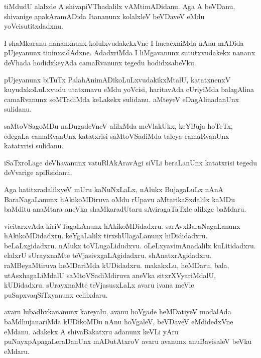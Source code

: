 \documentclass{article}
\begin{document}
\begin{mn}
tiMdudU  alalxde  A  shivapiVThadalilx  vAMtimADidanu.  Aga  A  beVDanu,  shivanige  apakAramADida  
Itananunx  kolalxleV  beVDaveV  eMdu  yoVcisutitxdadxnu.
\end{mn}

\begin{mn}
I  shaMkaranu  nananxnunx  kolulxvudakekxVne  I  hucacxniMda  nAnu  mADida  pUjeyanunx  tininxsidAdxne.  
AdadxriMda  I  liMgavanunx  sututxvudakekx  nananx  deVhada  hodidxkeyAda  camaRvanunx  tegedu  hodidxsabeVku.  
\end{mn}

\begin{mn}
pUjeyanunx  biTuTx  PalahAnimADikoLuLxvudakikxMtalU,  katatxnenxV  kuyudxkoLuLxvudu  utatxmavu  eMdu  yoVcisi,  
haritavAda  cUriyiMda  balagAlina  camaRvanunx  soMTadiMda  keLakekx  sulidanu.  aMteyeV  eDagAlinadanUnx  sulidanu.
\end{mn}

\begin{mn}
saMtoVSagoMDu  naDugadeVneV  alilxMda  meVlakUkx,  keYBuja hoTeTx,  edegaLa  camaRvanUnx  katatxrisi  
saMtoVSadiMda  taleya  camaRvanUnx  katatxrisi  sulidanu.
\end{mn}

\begin{mn}
iSaTxroLage  deVhavanunx  vatuRlAkAravAgi  siVLi  beraLanUnx  katatxrisi  tegedu  deVvarige  apiRsidanu.
\end{mn}

\begin{mn}
Aga  hatitxradalilxyeV  mUru  kaNuNxLaLx,  nAlukx  BujagaLuLx  nAnA  BaraNagaLanunx  hAkikoMDiruva  oMdu  
rUpavu  aMtarikaSxdalilx  kaMDu  baMditu  anaMtara  aneVka  shaMkaradUtaru  sAviragaTaTxle  alilxge  baMdaru.
\end{mn}

\begin{mn}
vicitarxvAda  kiriVTagaLAnunx  hAkikoMDidadxru.  sarAvxBaraNagaLanunx  hAkikoMDidadxru.  keYgaLalilx  
tirxshUlagaLanunx  hiDididadxru.  beLaLxgidadxru.  nAlukx  toVLugaLidudxvu.  oLeLxyavimAnadalilx  
kuLitidadxru.  elalxrU  sUrayxnaMte  teVjasivxgaLAgidadxru.  shAnatxrAgidadxru.  raMBeyaMtiruva  
heMDariMda  kUDidadxru.  makakxLu,  heMDaru,  bala,  utAsxhagaLiMdalU  saMtoVSadiMdiruva  aneVka  
sitxrXVyariMdalU,  kUDidadxru.  sUrayxnaMte  teVjasusxLaLx  avaru  ivana  meVle  puSapxvaqSiTxyanunx  celilxdaru.
\end{mn}

\begin{mn}
avaru  lubadhxkananunx  kareyalu,  avanu  hoVgade  heMDatiyeV  modalAda  baMdhujanariMda  kUDikoMDu  
nAnu  hoVgaleV,  beVDaveV  eMdidedxVne  eMdanu.  adakekx  A  shivaBakatxru  adanunx  keVLi  yAru  
puNayxpApagaLeraDanUnx  mADutAtxroV  avaru  avanunx  anuBavisaleV  beVku  eMdaru.
\end{mn}
\end{document}

